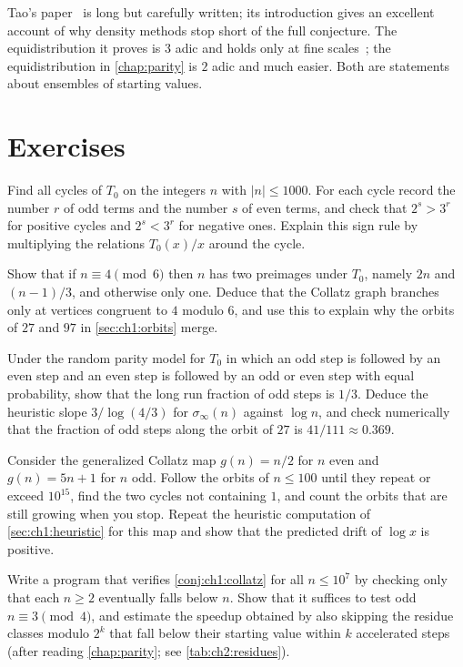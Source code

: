 Tao's paper~\cite{tao2022} is long but carefully written; its
introduction gives an excellent account of why density methods stop short of
the full conjecture. The equidistribution it proves is $3$ adic and holds
only at fine scales~\cite[Proposition~1.14 and Remark~1.15]{tao2022}; the
equidistribution in \cref{chap:parity} is $2$ adic and much easier. Both are
statements about ensembles of starting values.

\section*{Exercises}

\begin{exercise}\label{ex:ch1:negative}
Find all cycles of $T_0$ on the integers $n$ with $|n|\leq1000$. For each
cycle record the number $r$ of odd terms and the number $s$ of even terms, and
check that $2^s>3^r$ for positive cycles and $2^s<3^r$ for negative ones.
Explain this sign rule by multiplying the relations $T_0(x)/x$ around the
cycle.
\end{exercise}

\begin{exercise}\label{ex:ch1:merge}
Show that if $n\equiv4\pmod6$ then $n$ has two preimages under $T_0$, namely
$2n$ and $(n-1)/3$, and otherwise only one. Deduce that the Collatz graph
branches only at vertices congruent to $4$ modulo $6$, and use this to explain
why the orbits of $27$ and $97$ in \cref{sec:ch1:orbits} merge.
\end{exercise}

\begin{exercise}\label{ex:ch1:heuristic}
Under the random parity model for $T_0$ in which an odd step is followed by an
even step and an even step is followed by an odd or even step with equal
probability, show that the long run fraction of odd steps is $1/3$. Deduce the
heuristic slope $3/\log(4/3)$ for $\sigma_\infty(n)$ against $\log n$, and
check numerically that the fraction of odd steps along the orbit of $27$ is
$41/111\approx0.369$.
\end{exercise}

\begin{exercise}\label{ex:ch1:fractran}
Consider the generalized Collatz map $g(n)=n/2$ for $n$ even and $g(n)=5n+1$
for $n$ odd.
Follow the orbits of $n\leq100$ until they repeat or exceed $10^{15}$, find the two cycles not containing $1$, and count the orbits that are still growing when you stop.
Repeat the heuristic computation of \cref{sec:ch1:heuristic}
for this map and show that the predicted drift of $\log x$ is positive.
\end{exercise}

\begin{exercise}\label{ex:ch1:verify}
Write a program that verifies \cref{conj:ch1:collatz} for all $n\leq10^7$ by
checking only that each $n\geq2$ eventually falls below $n$. Show that it
suffices to test odd $n\equiv3\pmod4$, and estimate the speedup obtained by
also skipping the residue classes modulo $2^k$ that fall below their starting
value within $k$ accelerated steps (after reading \cref{chap:parity}; see \cref{tab:ch2:residues}).
\end{exercise}
